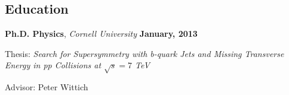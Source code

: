 \documentclass[margin,line]{res}
\newenvironment{list1}{
  \begin{list}{\ding{113}}{%
      \setlength{\itemsep}{0in}
      \setlength{\parsep}{0in} \setlength{\parskip}{0in}
      \setlength{\topsep}{0in} \setlength{\partopsep}{0in} 
      \setlength{\leftmargin}{0.17in}}}{\end{list}}
\newenvironment{list2}{
  \begin{list}{$\bullet$}{%
      \setlength{\itemsep}{0in}
      \setlength{\parsep}{0in} \setlength{\parskip}{0in}
      \setlength{\topsep}{0in} \setlength{\partopsep}{0in} 
      \setlength{\leftmargin}{0.2in}}}{\end{list}}
\begin{document}
\begin{resume}


\section{\sc Education}
{\bf Ph.D. Physics}, \textit{Cornell University} \hfill {\bf January, 2013}\\
\vspace*{-.1in}
\begin{list1}
\item[] Thesis: \textit{Search for Supersymmetry with b-quark Jets and Missing
\newline \hspace*{10.5 mm} Transverse Energy in pp Collisions at $\sqrt{s}=7$ TeV}
\item[] Advisor: Peter Wittich
\end{list1}

\end{resume}
\end{document}
